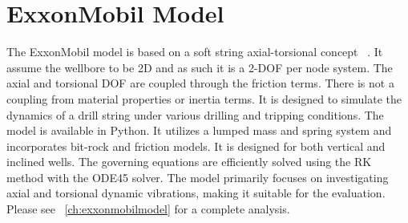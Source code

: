 \section{ExxonMobil Model}
The ExxonMobil model is based on a soft string axial-torsional concept ~\cite{ref:dixit2021a}. It assume the wellbore to be 2D and as such it is a 2-DOF per node system.  The axial and torsional DOF are coupled through the friction terms.  There is not a coupling from material properties or inertia terms.  It is designed to simulate the dynamics of a drill string under various drilling and tripping conditions. The model is available in Python. It utilizes a lumped mass and spring system and incorporates bit-rock and friction models. It is designed for both vertical and inclined wells. The governing equations are efficiently solved using the RK method with the ODE45 solver. The model primarily focuses on investigating axial and torsional dynamic vibrations, making it suitable for the evaluation. Please see \chaptername~\ref{ch:exxonmobilmodel} for a complete analysis. 